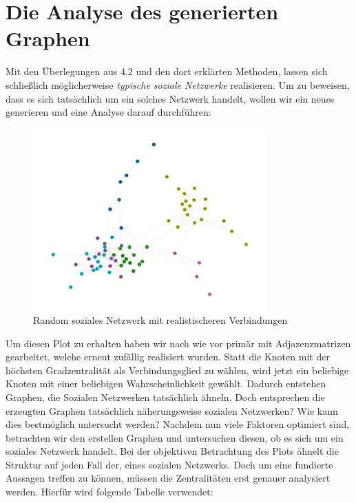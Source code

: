 \section{Die Analyse des generierten Graphen}
Mit den Überlegungen aus 4.2 und den dort erklärten Methoden, lassen sich schließlich möglicherweise \textit{typische soziale Netzwerke} realisieren. Um zu beweisen, dass es sich tatsächlich um ein solches Netzwerk handelt, wollen wir ein neues generieren und eine Analyse darauf durchführen:

\FloatBarrier
\begin{figure}[h!]
    \centering
    \hspace*{-2cm}
    \includegraphics[width=0.8\textwidth]{Graphics/Random_moreConnections.png}
    \caption{Random soziales Netzwerk mit realistischeren Verbindungen}
    \label{fig:SNA}
\end{figure}

\FloatBarrier
Um diesen Plot zu erhalten haben wir nach wie vor primär mit Adjazenzmatrizen gearbeitet, welche erneut zufällig realisiert wurden. Statt die Knoten mit der höchsten Gradzentralität als Verbindungsglied zu wählen, wird jetzt ein beliebige Knoten mit einer beliebigen Wahrscheinlichkeit gewählt. Dadurch entstehen Graphen, die Sozialen Netzwerken tatsächlich ähneln.
Doch entsprechen die erzeugten Graphen tatsächlich näherungsweise sozialen Netzwerken? Wie kann dies bestmöglich untersucht werden?
Nachdem nun viele Faktoren optimiert sind, betrachten wir den erstellen Graphen und untersuchen diesen, ob es sich um ein soziales Netzwerk handelt.
Bei der objektiven Betrachtung des Plots ähnelt die Struktur auf jeden Fall der, eines sozialen Netzwerks. Doch um eine fundierte Aussagen treffen zu können, müssen die Zentralitäten erst genauer analysiert werden. Hierfür wird folgende Tabelle verwendet:

